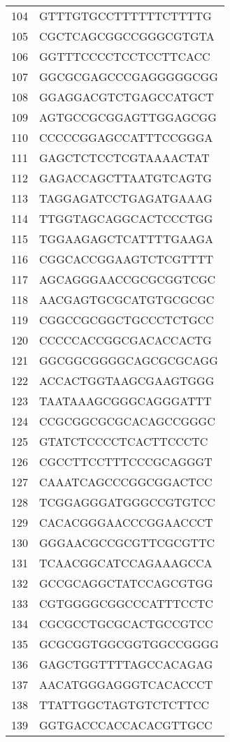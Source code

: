 \documentclass[letterpaper,12pt]{article}
\numberwithin{equation}{appendix}
\begin{document}
{{\begin{table}[ht]
\begin{tabular}{rl}
  104 & GTTTGTGCCTTTTTTCTTTTG \\ 
  105 & CGCTCAGCGGCCGGGCGTGTA \\ 
  106 & GGTTTCCCCTCCTCCTTCACC \\ 
  107 & GGCGCGAGCCCGAGGGGGCGG \\ 
  108 & GGAGGACGTCTGAGCCATGCT \\ 
  109 & AGTGCCGCGGAGTTGGAGCGG \\ 
  110 & CCCCCGGAGCCATTTCCGGGA \\ 
  111 & GAGCTCTCCTCGTAAAACTAT \\ 
  112 & GAGACCAGCTTAATGTCAGTG \\ 
  113 & TAGGAGATCCTGAGATGAAAG \\ 
  114 & TTGGTAGCAGGCACTCCCTGG \\ 
  115 & TGGAAGAGCTCATTTTGAAGA \\ 
  116 & CGGCACCGGAAGTCTCGTTTT \\ 
  117 & AGCAGGGAACCGCGCGGTCGC \\ 
  118 & AACGAGTGCGCATGTGCGCGC \\ 
  119 & CGGCCGCGGCTGCCCTCTGCC \\ 
  120 & CCCCCACCGGCGACACCACTG \\ 
  121 & GGCGGCGGGGCAGCGCGCAGG \\ 
  122 & ACCACTGGTAAGCGAAGTGGG \\ 
  123 & TAATAAAGCGGGCAGGGATTT \\ 
  124 & CCGCGGCGCGCACAGCCGGGC \\ 
  125 & GTATCTCCCCTCACTTCCCTC \\ 
  126 & CGCCTTCCTTTCCCGCAGGGT \\ 
  127 & CAAATCAGCCCGGCGGACTCC \\ 
  128 & TCGGAGGGATGGGCCGTGTCC \\ 
  129 & CACACGGGAACCCGGAACCCT \\ 
  130 & GGGAACGCCGCGTTCGCGTTC \\ 
  131 & TCAACGGCATCCAGAAAGCCA \\ 
  132 & GCCGCAGGCTATCCAGCGTGG \\ 
  133 & CGTGGGGCGGCCCATTTCCTC \\ 
  134 & CGCGCCTGCGCACTGCCGTCC \\ 
  135 & GCGCGGTGGCGGTGGCCGGGG \\ 
  136 & GAGCTGGTTTTAGCCACAGAG \\ 
  137 & AACATGGGAGGGTCACACCCT \\ 
  138 & TTATTGGCTAGTGTCTCTTCC \\ 
  139 & GGTGACCCACCACACGTTGCC \\ 

\end{tabular}
\end{table}}}
\end{document}
